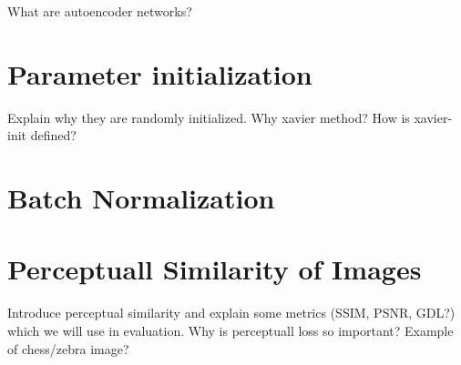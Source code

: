 What are autoencoder networks?


\section{Parameter initialization}

Explain why they are randomly initialized. Why xavier method? How is xavier-init defined?


\section{Batch Normalization}


\section{Perceptuall Similarity of Images}

Introduce perceptual similarity and explain some metrics (SSIM, PSNR, GDL?) which we will use in evaluation.
Why is perceptuall loss so important? Example of chess/zebra image?

